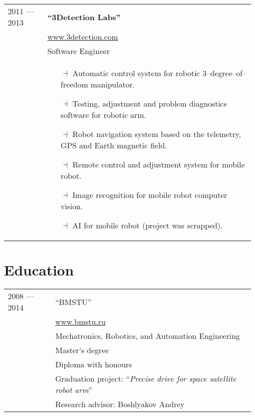 \documentclass[a4paper, 10pt]{article}
\begin{document}
\begin{longtable}{p{20mm}|p{140mm}}
2011 --- 2013 & \textbf{``3Detection Labs''} \\
& \href{http://www.3detection.com/}{www.3detection.com} \\
& Software Engineer \\
& \begin{itemize}[topsep = 0pt, itemsep = 0pt]
    \item[$\dashv$] Automatic control system for robotic 3--degree--of--freedom manipulator.
    \item[$\dashv$] Testing, adjustment and problem diagnostics software for robotic arm.
    \item[$\dashv$] Robot navigation system based on the telemetry, GPS and Earth magnetic field.
    \item[$\dashv$] Remote control and adjustment system for mobile robot.
    \item[$\dashv$] Image recognition for mobile robot computer vision.
    \item[$\dashv$] AI for mobile robot (project was scrapped).
\end{itemize}
\\
\end{longtable}

\section{Education}
\begin{longtable}{p{20mm}|p{140mm}}
2008 --- 2014
& ``BMSTU'' \\
& \href{http://www.bmstu.ru}{www.bmstu.ru} \\
& Mechatronics, Robotics, and Automation Engineering \\
& Master's degree \\
& Diploma with honours \\
& Graduation project: ``\textit{Precise drive for space satellite robot arm}'' \\
& Research advisor: Boshlyakov Andrey \\
\end{longtable}

\end{document}
